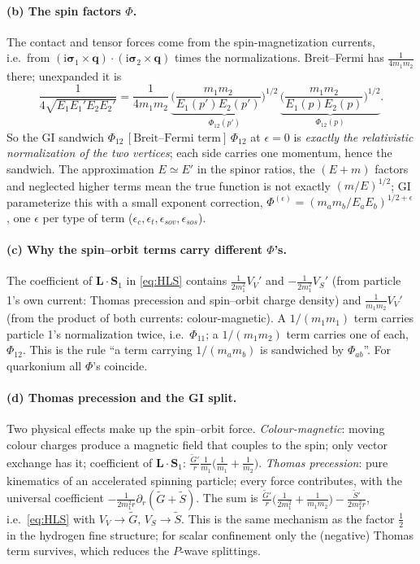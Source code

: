 \documentclass[11pt,a4paper]{article}
\numberwithin{equation}{section}
\theoremstyle{definition}
\theoremstyle{plain}
\theoremstyle{remark}
\numberwithin{algorithm}{section}
\newcommand{\vq}{\bm q}
\newcommand{\vL}{\bm L}
\newcommand{\vS}{\bm S}
\newcommand{\vsig}{\bm\sigma}
\newcommand{\ii}{\mathrm{i}}
\begin{document}
\paragraph{(b) The spin factors $\Phi$.} The contact and tensor forces come from the spin-magnetization currents, i.e.\ from $(\ii\vsig_1\times\vq)\cdot(\ii\vsig_2\times\vq)$ times the normalizations. Breit--Fermi has $\frac{1}{4m_1m_2}$ there; unexpanded it is
\begin{equation}
\frac{1}{4\sqrt{E_1E_1'E_2E_2'}}=\frac{1}{4m_1m_2}\,
\underbrace{\Big(\frac{m_1m_2}{E_1(p')E_2(p')}\Big)^{1/2}}_{\Phi_{12}(p')}\,
\underbrace{\Big(\frac{m_1m_2}{E_1(p)E_2(p)}\Big)^{1/2}}_{\Phi_{12}(p)} .
\end{equation}
So the GI sandwich $\Phi_{12}\,[\text{Breit--Fermi term}]\,\Phi_{12}$ at $\epsilon=0$ is \emph{exactly the relativistic normalization of the two vertices}; each side carries one momentum, hence the sandwich. The approximation $E\simeq E'$ in the spinor ratios, the $(E+m)$ factors and neglected higher terms mean the true function is not exactly $(m/E)^{1/2}$; GI parameterize this with a small exponent correction, $\Phi^{(\epsilon)}=(m_am_b/E_aE_b)^{1/2+\epsilon}$, one $\epsilon$ per type of term ($\epsilon_c,\epsilon_t,\epsilon_{sov},\epsilon_{sos}$).

\paragraph{(c) Why the spin--orbit terms carry different $\Phi$'s.} The coefficient of $\vL\cdot\vS_1$ in \eqref{eq:HLS} contains $\frac{1}{2m_1^2}V_V'$ and $-\frac1{2m_1^2}V_S'$ (from particle 1's own current: Thomas precession and spin--orbit charge density) and $\frac{1}{m_1m_2}V_V'$ (from the product of both currents: colour-magnetic). A $1/(m_1m_1)$ term carries particle 1's normalization twice, i.e.\ $\Phi_{11}$; a $1/(m_1m_2)$ term carries one of each, $\Phi_{12}$. This is the rule ``a term carrying $1/(m_am_b)$ is sandwiched by $\Phi_{ab}$''. For quarkonium all $\Phi$'s coincide.

\paragraph{(d) Thomas precession and the GI split.} Two physical effects make up the spin--orbit force. \emph{Colour-magnetic}: moving colour charges produce a magnetic field that couples to the spin; only vector exchange has it; coefficient of $\vL\cdot\vS_1$: $\frac{\tilde G'}{r}\frac1{m_1}\big(\frac1{m_1}+\frac1{m_2}\big)$. \emph{Thomas precession}: pure kinematics of an accelerated spinning particle; every force contributes, with the universal coefficient $-\frac{1}{2m_1^2r}\partial_r(\tilde G+\tilde S)$. The sum is $\frac{\tilde G'}r\big(\frac1{2m_1^2}+\frac1{m_1m_2}\big)-\frac{\tilde S'}{2m_1^2r}$, i.e.\ \eqref{eq:HLS} with $V_V\to\tilde G$, $V_S\to\tilde S$. This is the same mechanism as the factor $\frac12$ in the hydrogen fine structure; for scalar confinement only the (negative) Thomas term survives, which reduces the $P$-wave splittings.
\end{document}
